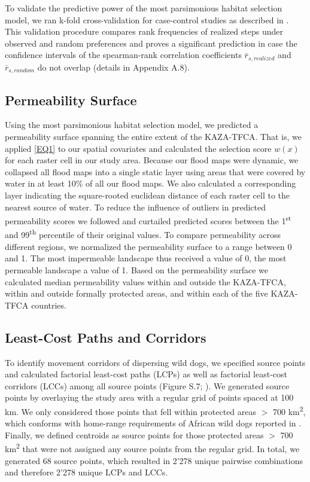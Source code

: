 \documentclass[abstract=on,10pt,a4paper,bibliography=totocnumbered]{article}
\begin{document}
To validate the predictive power of the most parsimonious habitat selection
model, we ran k-fold cross-validation for case-control studies as described in
\cite{Fortin.2009}. This validation procedure compares rank frequencies of
realized steps under observed and random preferences and proves a significant
prediction in case the confidence intervals of the spearman-rank correlation
coefficients \(\bar{r}_{s, realized}\) and \(\bar{r}_{s, random}\) do not
overlap (details in Appendix A.8).

\subsection{Permeability Surface}
Using the most parsimonious habitat selection model, we predicted a permeability
surface spanning the entire extent of the KAZA-TFCA. That is, we applied
\ref{EQ1} to our spatial covariates and calculated the selection score \(w(x)\)
for each raster cell in our study area. Because our flood maps were dynamic, we
collapsed all flood maps into a single static layer using areas that were
covered by water in at least 10\% of all our flood maps. We also calculated a
corresponding layer indicating the square-rooted euclidean distance of each
raster cell to the nearest source of water. To reduce the influence of outliers
in predicted permeability scores we followed \cite{Squires.2013} and curtailed
predicted scores between the 1\textsuperscript{st} and 99\textsuperscript{th}
percentile of their original values. To compare permeability across different
regions, we normalized the permeability surface to a range between 0 and 1. The
most impermeable landscape thus received a value of 0, the most permeable
landscape a value of 1. Based on the permeability surface we calculated median
permeability values within and outside the KAZA-TFCA, within and outside
formally protected areas, and within each of the five KAZA-TFCA countries.

\subsection{Least-Cost Paths and Corridors}
To identify movement corridors of dispersing wild dogs, we specified source
points and calculated factorial least-cost paths (LCPs) as well as factorial
least-cost corridors (LCCs) among all source points (Figure S.7;
\citealp{Adriaensen.2003, Sawyer.2011, Elliot.2014}). We generated source points
by overlaying the study area with a regular grid of points spaced at 100 km. We
only considered those points that fell within protected areas \(>\) 700
km\textsuperscript{2}, which conforms with home-range requirements of African
wild dogs reported in \cite{Pomilia.2015}. Finally, we defined centroids as
source points for those protected areas \(>\) 700 km\textsuperscript{2} that
were not assigned any source points from the regular grid. In total, we
generated 68 source points, which resulted in 2'278 unique pairwise combinations
and therefore 2'278 unique LCPs and LCCs.
\end{document}
